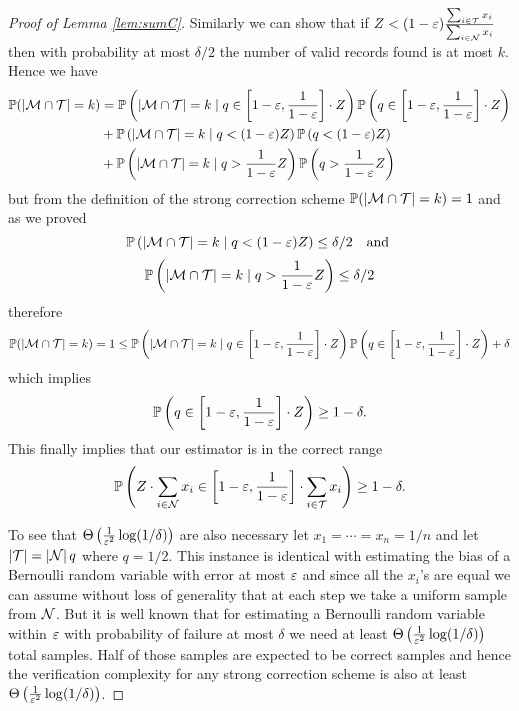 \begin{proof}[Proof of Lemma \ref{lem:sumC}]
  Similarly we can show that if $Z < (1 - \varepsilon) \frac{\sum_{i \in \mathcal{T}} x_i}{\sum_{i \in \mathcal{N}} x_i}$ then with probability at most $\delta / 2$ the number of valid records found is at most $k$. Hence we have
\begin{align*}
  \mathbb{P}(\left|\mathcal{M} \cap \mathcal{T}\right| = k) & = \mathbb{P}\left(\left|\mathcal{M} \cap \mathcal{T}\right| = k \mid q \in \left[ 1 - \varepsilon, \frac{1}{1 - \varepsilon} \right] \cdot Z \right) \mathbb{P}\left( q \in \left[ 1 - \varepsilon, \frac{1}{1 - \varepsilon} \right] \cdot Z \right) \\
               & + \mathbb{P}\left(\left|\mathcal{M} \cap \mathcal{T}\right| = k \mid q < (1 - \varepsilon) Z \right) \mathbb{P}\left( q < (1 - \varepsilon) Z \right) \\
               & + \mathbb{P}\left(\left|\mathcal{M} \cap \mathcal{T}\right| = k \mid q > \frac{1}{1 - \varepsilon} Z \right) \mathbb{P}\left( q > \frac{1}{1 - \varepsilon} Z \right)
\end{align*}
\noindent but from the definition of the strong correction scheme $\mathbb{P}(\left|\mathcal{M} \cap \mathcal{T}\right| = k) = 1$ and as we proved 
\[ \mathbb{P}\left(\left|\mathcal{M} \cap \mathcal{T}\right| = k \mid q < (1 - \varepsilon) Z \right) \le \delta / 2 ~~ \text{ and } \]
\[ \mathbb{P}\left(\left|\mathcal{M} \cap \mathcal{T}\right| = k \mid q > \frac{1}{1 - \varepsilon} Z \right) \le \delta / 2 \]
\noindent therefore
\begin{align*}
  \mathbb{P}(\left|\mathcal{M} \cap \mathcal{T}\right| = k) = 1 & \le \mathbb{P}\left(\left|\mathcal{M} \cap \mathcal{T}\right| = k \mid q \in \left[ 1 - \varepsilon, \frac{1}{1 - \varepsilon} \right] \cdot Z \right) \mathbb{P}\left( q \in \left[ 1 - \varepsilon, \frac{1}{1 - \varepsilon} \right] \cdot Z \right) + \delta \\
\end{align*}
\noindent which implies
\[ \mathbb{P}\left( q \in \left[ 1 - \varepsilon, \frac{1}{1 - \varepsilon} \right] \cdot Z \right) \ge 1 - \delta. \]
  This finally implies that our estimator is in the correct range
\[ \mathbb{P}\left( Z \cdot \sum_{i \in \mathcal{N}} x_i \in \left[ 1 - \varepsilon, \frac{1}{1 - \varepsilon} \right] \cdot \sum_{i \in \mathcal{T}} x_i \right) \ge 1 - \delta. \]

  To see that $\Theta\left(\frac{1}{\varepsilon^2}\log (1/\delta)\right)$ are also necessary let $x_1 = \cdots = x_n = 1 / n$ and let 
$\left|\mathcal{T}\right| = \left|\mathcal{N}\right| q$ where $q = 1/2$. This instance is identical with estimating the
bias of a Bernoulli random variable with error at most $\varepsilon$ and since all the $x_i$'s are equal we can assume without loss 
of generality that at each step we take a uniform sample from $\mathcal{N}$. But it is well known that for
estimating a Bernoulli random variable within $\varepsilon$ with probability of failure at most $\delta$ we need at least 
$\Theta\left(\frac{1}{\varepsilon^2}\log (1/\delta)\right)$ total samples. Half of those samples are expected to be correct samples
and hence the verification complexity for any strong correction scheme is also at least 
$\Theta\left(\frac{1}{\varepsilon^2}\log (1/\delta)\right)$.
\end{proof}


